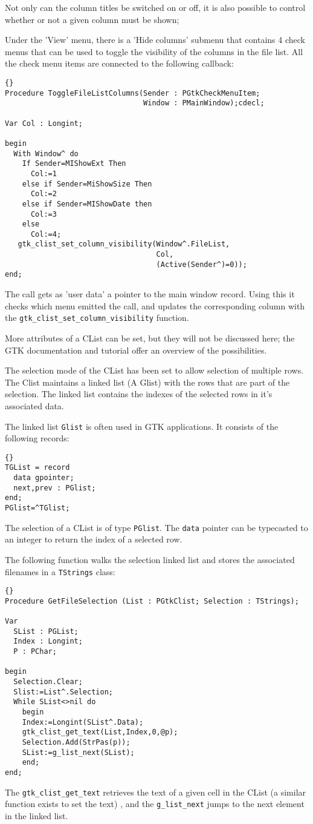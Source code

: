 \documentclass[10pt]{article}
\begin{document}
Not only can the column titles be switched on or off, it is also possible to
control whether or not a given column must be shown;

Under the 'View' menu, there is a 'Hide columns' submenu that contains 4
check menus that can be used to toggle the visibility of the columns in the
file list. All the check menu items are connected to the following callback:
\begin{lstlisting}{}
Procedure ToggleFileListColumns(Sender : PGtkCheckMenuItem;
                                Window : PMainWindow);cdecl;

Var Col : Longint;

begin
  With Window^ do
    If Sender=MIShowExt Then
      Col:=1
    else if Sender=MiShowSize Then
      Col:=2
    else if Sender=MIShowDate then
      Col:=3
    else 
      Col:=4;
   gtk_clist_set_column_visibility(Window^.FileList,
                                   Col,
                                   (Active(Sender^)=0));   
end;
\end{lstlisting}
The call gets as 'user data' a pointer to the main window record. Using this
it checks which menu emitted the call, and updates the corresponding column
with the \lstinline|gtk_clist_set_column_visibility| function.

More attributes of a CList can be set, but they will not be discussed here; 
the GTK documentation and tutorial offer an overview of the possibilities. 

The selection mode of the CList has been set to allow selection of multiple
rows. The Clist maintains a linked list (A Glist) with the rows that are
part of the selection. The linked list contains the indexes of the selected
rows in it's associated data.

The linked list \lstinline|Glist| is often used in GTK applications. 
It consists of the  following records:
\begin{lstlisting}{}
TGList = record
  data gpointer;
  next,prev : PGlist;
end;
PGlist=^TGlist;
\end{lstlisting}
The selection of a CList is of type \lstinline|PGlist|. The \lstinline|data|
pointer can be typecasted to an integer to return the index of a selected
row.

The following function walks the selection linked list and stores the
associated filenames in a \lstinline|TStrings| class:
\begin{lstlisting}{}
Procedure GetFileSelection (List : PGtkClist; Selection : TStrings);

Var
  SList : PGList;
  Index : Longint;
  P : PChar;
  
begin
  Selection.Clear;
  Slist:=List^.Selection;
  While SList<>nil do
    begin
    Index:=Longint(SList^.Data);
    gtk_clist_get_text(List,Index,0,@p);
    Selection.Add(StrPas(p));
    SList:=g_list_next(SList);
    end;
end;
\end{lstlisting}
The \lstinline|gtk_clist_get_text| retrieves the text of a given cell in the
CList (a similar function exists to set the text) , and the
\lstinline|g_list_next| jumps to the next element in the linked list.
\end{document}
